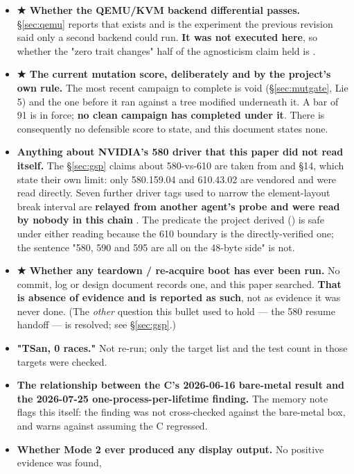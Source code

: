 \documentclass[10.5pt]{article}
\begin{document}
\begin{itemize}
{  is worth more on this list than a corrected sentence.}
\item \textbf{★ Whether the QEMU/KVM backend differential passes.} \S\ref{sec:qemu} reports that
  exists and is the experiment the
  previous revision said only a second backend could run. \textbf{It was not executed here}, so
  whether the "zero trait changes" half of the agnosticism claim held is \unver{}.
\item \textbf{★ The current mutation score, deliberately and by the project's own rule.} The most
  recent campaign to complete is void (\S\ref{sec:mutgate}, Lie 5) and the one before it ran
  against a tree modified underneath it. A bar of 91 is in force; \textbf{no clean campaign has
  completed under it}. There is consequently no defensible score to state, and this document
  states none.
\item \textbf{Anything about NVIDIA's 580 driver that this paper did not read itself.} The
  \S\ref{sec:gsp} claims about 580-vs-610 are taken from
   and  \S14,
  which state their own limit: only 580.159.04 and 610.43.02 are vendored and were read directly.
  Seven further driver tags used to narrow the element-layout break interval are \textbf{relayed
  from another agent's probe and were read by nobody in this chain} \unver{}. The predicate the
  project derived () is safe under either reading because the 610 boundary is
  the directly-verified one; the sentence "580, 590 and 595 are all on the 48-byte side" is not.
\item \textbf{★ Whether any teardown / re-acquire boot has ever been run.} No commit, log or
  design document records one, and this paper searched. \textbf{That is absence of evidence and is
  reported as such}, not as evidence it was never done. (The \emph{other} question this bullet
  used to hold — the 580 resume handoff — is resolved; see \S\ref{sec:gsp}.)
\item \textbf{"TSan, 0 races."} Not re-run; only the target list and the test count in those
  targets were checked.
\item \textbf{The relationship between the C's 2026-06-16 bare-metal result and the 2026-07-25
  one-process-per-lifetime finding.} The memory note flags this itself: the finding was not
  cross-checked against the bare-metal box, and warns against assuming the C regressed.
\item \textbf{Whether Mode 2 ever produced any display output.} No positive evidence was found,

\end{itemize}
\end{document}

